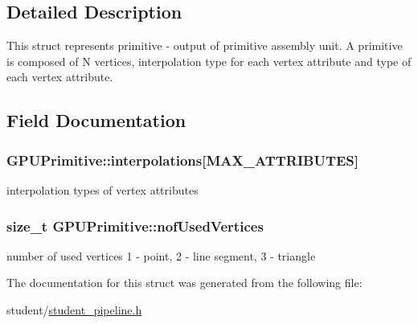 \subsection{Detailed Description}
This struct represents primitive -\/ output of primitive assembly unit. A primitive is composed of N vertices, interpolation type for each vertex attribute and type of each vertex attribute. 

\subsection{Field Documentation}
\hypertarget{structGPUPrimitive_a52b0316277ee6ac63d4e898ea3bb1864}{
\subsubsection[{interpolations}]{ G\-P\-U\-Primitive\-::interpolations\mbox{[}{\bf M\-A\-X\-\_\-\-A\-T\-T\-R\-I\-B\-U\-T\-E\-S}\mbox{]}}}\label{structGPUPrimitive_a52b0316277ee6ac63d4e898ea3bb1864}
interpolation types of vertex attributes \hypertarget{structGPUPrimitive_aaeea5342673689813c4aff110677d403}{
\subsubsection[{nof\-Used\-Vertices}]{\setlength{\rightskip}{0pt plus 5cm}size\-\_\-t G\-P\-U\-Primitive\-::nof\-Used\-Vertices}}\label{structGPUPrimitive_aaeea5342673689813c4aff110677d403}
number of used vertices 1 -\/ point, 2 -\/ line segment, 3 -\/ triangle 

The documentation for this struct was generated from the following file\-:\begin{DoxyCompactItemize}
\item 
student/\hyperlink{student__pipeline_8h}{student\-\_\-pipeline.\-h}\end{DoxyCompactItemize}
